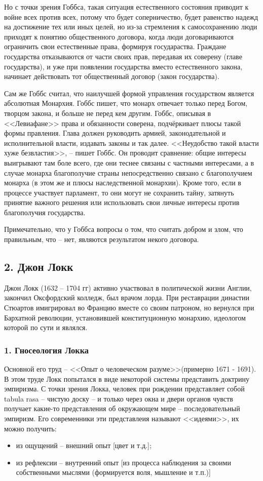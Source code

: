 \documentclass[a4paper, 12pt]{book} %
\begin{document}
Но с точки зрения Гоббса, такая ситуация естественного состояния приводит к войне всех против всех, потому что будет соперничество, будет равенство надежд на достижение тех или иных целей,  но из-за стремления к самосохранению люди приходят к понятию общественного договора, когда люди договариваются ограничить свои естественные права, формируя государаства. Граждане государства отказываются от части своих прав, передавая их соверену (главе государства), и уже при появлении государства вместо естественного закона, начинает действовать тот общественный договор (закон государства).

Сам же Гоббс считал, что наилучшей формой управления государством является абсолютная Монархия. Гоббс пишет, что монарх отвечает только перед Богом, творцом закона, и больше не перед кем другим. Гоббс, описывая в <<Левиафане>> права и обязанности соверена, подчёркивает плюсы такой формы правления. Глава должен руководить армией, законодательной и исполнительной власти, издавать законы и так далее. <<Неудобство такой власти хуже безвластия>>, --  пишет Гоббс. Он проводит сравнение: общие интересы выигрывают там боле всего, где они теснее связаны с частными интересами, а в случае монарха благополучие страны непосредственно связано с благополучием монарха (в этом же и плюсы наследственной монархии). Кроме того, если в процессе участвует парламент, то они могут не сохранить тайну, затянуть принятие важного решения или использовать свои личные интересы против благополучия государства.

Примечательно, что у Гоббса вопросы о том, что считать добром и злом, что правильным, что -- нет, являются результатом некого договора. 

\subsection*{2. Джон Локк}
Джон Локк (1632 -- 1704 гг) активно участвовал в политической жизни Англии, закончил Оксфордский колледж, был врачом лорда. При реставрации династии Стюартов имигрировал во Францию вместе со своим патроном, но вернулся при Бархатной революции, установившей конституционную монархию, идеологом которой по сути и являлся.	

\subsubsection*{1. Гносеология Локка}
Основной его труд -- <<Опыт о человеческом разуме>>(примерно 1671 - 1691). В этом труде Локк попытался в виде некоторой системы представить доктрину эмпиризма. С точки зрения Локка, человек при рождении представляет собой tabula rasa -- чистую доску -- и только через окна и двери органов чувств получает какие-то представления об окружающем мире -- последовательный эмпиризм. Его современники эти представлеия называют <<идеями>>, их можно получить:
\begin{itemize}
\item из ощущений -- внешний опыт [цвет и т.д.];
\item из рефлексии -- внутренний опыт [из процесса наблюдения за своими собственными мыслями (формируется воля, мышление и т.п.)]
\end{itemize}
\end{document}
